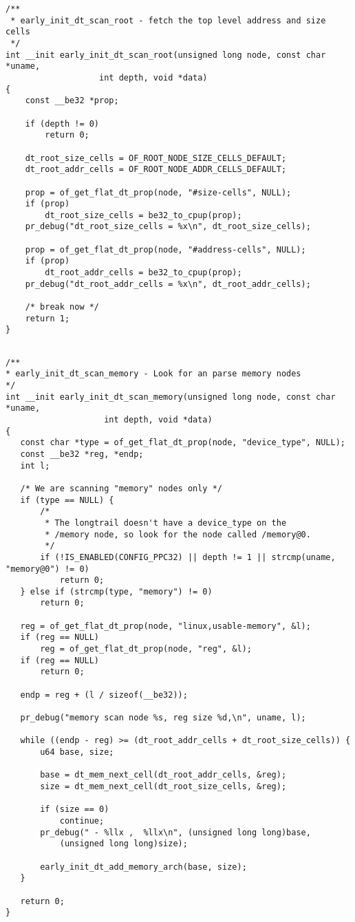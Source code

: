 \begin{lstlisting}
/**
 * early_init_dt_scan_root - fetch the top level address and size cells
 */
int __init early_init_dt_scan_root(unsigned long node, const char *uname,
				   int depth, void *data)
{
	const __be32 *prop;

	if (depth != 0)
		return 0;

	dt_root_size_cells = OF_ROOT_NODE_SIZE_CELLS_DEFAULT;
	dt_root_addr_cells = OF_ROOT_NODE_ADDR_CELLS_DEFAULT;

	prop = of_get_flat_dt_prop(node, "#size-cells", NULL);
	if (prop)
		dt_root_size_cells = be32_to_cpup(prop);
	pr_debug("dt_root_size_cells = %x\n", dt_root_size_cells);

	prop = of_get_flat_dt_prop(node, "#address-cells", NULL);
	if (prop)
		dt_root_addr_cells = be32_to_cpup(prop);
	pr_debug("dt_root_addr_cells = %x\n", dt_root_addr_cells);

	/* break now */
	return 1;
}
\end{lstlisting}



\begin{lstlisting}
 
/**
* early_init_dt_scan_memory - Look for an parse memory nodes
*/
int __init early_init_dt_scan_memory(unsigned long node, const char *uname,
                    int depth, void *data)
{
   const char *type = of_get_flat_dt_prop(node, "device_type", NULL);
   const __be32 *reg, *endp;
   int l;

   /* We are scanning "memory" nodes only */
   if (type == NULL) {
       /*
        * The longtrail doesn't have a device_type on the
        * /memory node, so look for the node called /memory@0.
        */
       if (!IS_ENABLED(CONFIG_PPC32) || depth != 1 || strcmp(uname, "memory@0") != 0)
           return 0;
   } else if (strcmp(type, "memory") != 0)
       return 0;

   reg = of_get_flat_dt_prop(node, "linux,usable-memory", &l);
   if (reg == NULL)
       reg = of_get_flat_dt_prop(node, "reg", &l);
   if (reg == NULL)
       return 0;

   endp = reg + (l / sizeof(__be32));

   pr_debug("memory scan node %s, reg size %d,\n", uname, l);

   while ((endp - reg) >= (dt_root_addr_cells + dt_root_size_cells)) {
       u64 base, size;

       base = dt_mem_next_cell(dt_root_addr_cells, &reg);
       size = dt_mem_next_cell(dt_root_size_cells, &reg);

       if (size == 0)
           continue;
       pr_debug(" - %llx ,  %llx\n", (unsigned long long)base,
           (unsigned long long)size);

       early_init_dt_add_memory_arch(base, size);
   }

   return 0;
}   
\end{lstlisting}